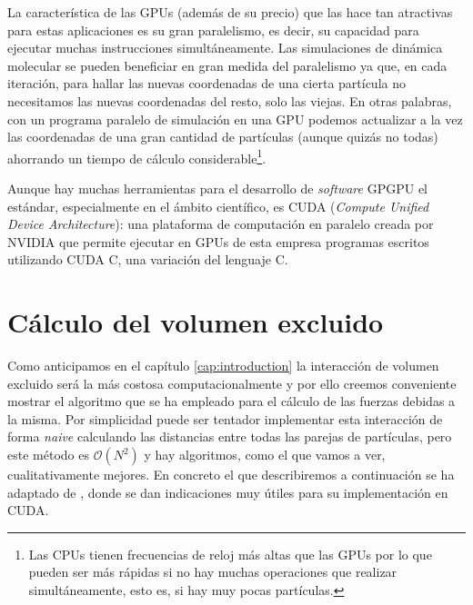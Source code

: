 La característica de las GPUs (además de su precio) que las hace tan atractivas para estas aplicaciones es su gran paralelismo, es decir, su capacidad para ejecutar muchas instrucciones simultáneamente. Las simulaciones de dinámica molecular se pueden beneficiar en gran medida del paralelismo ya que, en cada iteración, para hallar las nuevas coordenadas de una cierta partícula no necesitamos las nuevas coordenadas del resto, solo las viejas. En otras palabras, con un programa paralelo de simulación en una GPU podemos actualizar a la vez las coordenadas de una gran cantidad de partículas (aunque quizás no todas) ahorrando un tiempo de cálculo considerable\footnote{Las CPUs tienen frecuencias de reloj más altas que las GPUs por lo que pueden ser más rápidas si no hay muchas operaciones que realizar simultáneamente, esto es, si hay muy pocas partículas.}.

Aunque hay muchas herramientas para el desarrollo de \textit{software} GPGPU el estándar, especialmente en el ámbito científico, es CUDA \cite{Wilt2013} (\textit{Compute Unified Device Architecture}): una plataforma de computación en paralelo creada por NVIDIA que permite ejecutar en GPUs de esta empresa programas escritos utilizando CUDA C, una variación del lenguaje C.

\section{Cálculo del volumen excluido}

Como anticipamos en el capítulo \ref{cap:introduction} la interacción de volumen excluido será la más costosa computacionalmente y por ello creemos conveniente mostrar el algoritmo que se ha empleado para el cálculo de las fuerzas debidas a la misma. Por simplicidad puede ser tentador implementar esta interacción de forma \textit{naive} calculando las distancias entre todas las parejas de partículas, pero este método es $\mathcal{O}(N^2)$ y hay algoritmos, como el que vamos a ver, cualitativamente mejores. En concreto el que describiremos a continuación se ha adaptado de \cite{Green2010}, donde se dan indicaciones muy útiles para su implementación en CUDA.

